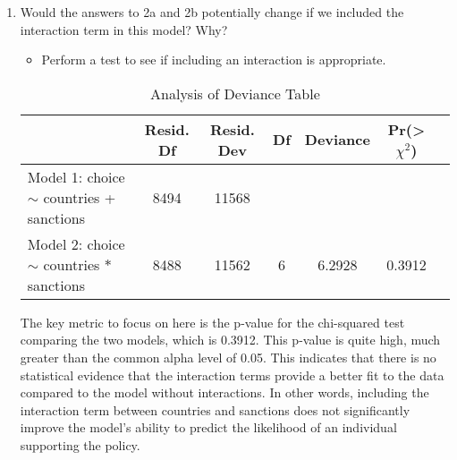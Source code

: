 \documentclass[12pt,letterpaper]{article}
\begin{document}
\begin{enumerate}
\begin{enumerate}
		\item
		Would the answers to 2a and 2b potentially change if we included the interaction term in this model? Why? 
		\begin{itemize}
			\item Perform a test to see if including an interaction is appropriate.
		\end{itemize}
		
		\begin{table}[h!]
			\centering
			\caption{Analysis of Deviance Table}
			\begin{tabular}{lcccccc}
				\hline
				& Resid. Df & Resid. Dev & Df & Deviance & Pr(>\(\chi^2\)) \\
				\hline
				Model 1: choice \(\sim\) countries + sanctions & 8494 & 11568 & & & \\
				Model 2: choice \(\sim\) countries \(\ast\) sanctions & 8488 & 11562 & 6 & 6.2928 & 0.3912 \\
				\hline
			\end{tabular}
			\label{table:deviance} 
		\end{table}
	The key metric to focus on here is the p-value for the chi-squared test comparing the two models, which is 0.3912. This p-value is quite high, much greater than the common alpha level of 0.05. This indicates that there is no statistical evidence that the interaction terms provide a better fit to the data compared to the model without interactions. In other words, including the interaction term between countries and sanctions does not significantly improve the model's ability to predict the likelihood of an individual supporting the policy.
		
	\end{enumerate}
	\end{enumerate}
\end{document}
